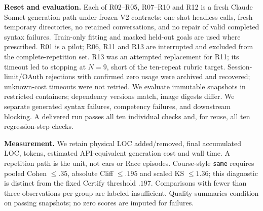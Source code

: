 \documentclass[sigconf,nonacm]{acmart}
\begin{document}
\textbf{Reset and evaluation.} Each of R02--R05, R07--R10 and R12 is a fresh Claude Sonnet generation path under frozen V2 contracts: one-shot headless calls, fresh temporary directories, no retained conversations, and no repair of valid completed syntax failures. Train-only fitting and masked held-out goals are used where prescribed. R01 is a pilot; R06, R11 and R13 are interrupted and excluded from the complete-repetition set. R13 was an attempted replacement for R11; its timeout led to stopping at $N=9$, short of the ten-repeat rubric target. Session-limit/OAuth rejections with confirmed zero usage were archived and recovered; unknown-cost timeouts were not retried. We evaluate immutable snapshots in restricted containers; dependency versions match, image digests differ. We separate generated syntax failures, competency failures, and downstream blocking. A delivered run passes all ten individual checks and, for reuse, all ten regression-step checks.

\textbf{Measurement.} We retain physical LOC added/removed, final accumulated LOC, tokens, estimated API-equivalent generation cost and wall time. A repetition path is the unit, not cars or Race episodes. Course-style \texttt{same} requires pooled Cohen $\leq .35$, absolute Cliff $\leq .195$ and scaled KS $\leq 1.36$; this diagnostic is distinct from the fixed Certify threshold $.197$. Comparisons with fewer than three observations per group are labeled insufficient. Quality summaries condition on passing snapshots; no zero scores are imputed for failures.
\end{document}
